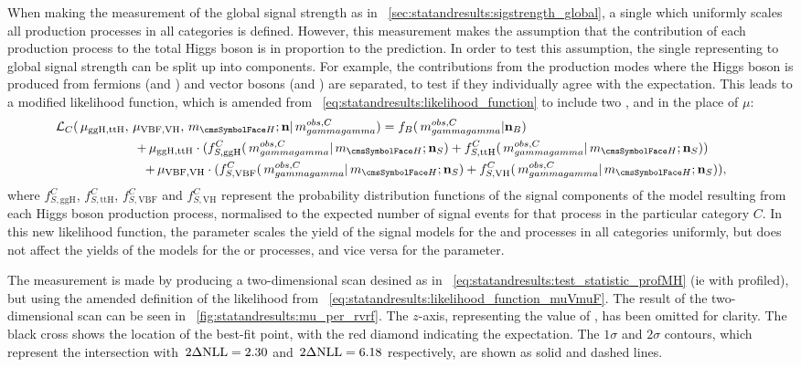 When making the measurement of the global signal strength as in \Sec~\ref{sec:statandresults:sigstrength_global}, a single \POI which uniformly scales all production processes in all categories is defined. However, this measurement makes the assumption that the contribution of each production process to the total Higgs boson \crosssection is in proportion to the \SM prediction. In order to test this assumption, the single \POI representing to global signal strength can be split up into components. For example, the contributions from the production modes where the Higgs boson is produced from fermions (\ggH and \ttH) and vector bosons (\VBF and \VH) are separated, to test if they individually agree with the \SM expectation. This leads to a modified likelihood function, which is amended from \Eq~\ref{eq:statandresults:likelihood_function} to include two \POI\s, \muF and \muV in the place of $\mu$:
\begin{equation}
\label{eq:statandresults:likelihood_function_muVmuF}
\begin{split} \mathcal{L}_C(\muF, \muV, \mH; \mathbf{n} | \mgg^{obs,C} ) = f_B(\mgg^{obs,C} | \mathbf{n}_B )\hspace{6cm}  \\ 
+\muF \cdot ( f^C_{S,{\text{ggH}}}(\mgg^{obs,C} |\mH ; \mathbf{n}_S) +  f^C_{S,{\text{ttH}}}(\mgg^{obs,C} |\mH ; \mathbf{n}_S) ) \hspace{1cm} \\  
+\muV \cdot ( f^C_{S,{\text{VBF}}}(\mgg^{obs,C} |\mH ; \mathbf{n}_S) +  f^C_{S,{\text{VH}}}(\mgg^{obs,C} |\mH ; \mathbf{n}_S) ), \hspace{0.5cm} \\  
\end{split} 
\end{equation}
where $f^C_{S,{\text{ggH}}}$, $f^C_{S,{\text{ttH}}}$, $f^C_{S,{\text{VBF}}}$ and $f^C_{S,{\text{VH}}}$ represent the probability distribution functions of the signal components of the model resulting from each Higgs boson production process, normalised to the expected number of signal events for that process in the particular category $C$. In this new likelihood function, the \muF parameter scales the yield of the signal models for the \ggH and \ttH processes in all categories uniformly, but does not affect the yields of the models for the \VBF or \VH processes, and vice versa for the \muV parameter.

The measurement is made by producing a two-dimensional \DNLL scan desined as in \Eq~\ref{eq:statandresults:test_statistic_profMH} (ie with \mH profiled), but using the amended definition of the likelihood from \Eq~\ref{eq:statandresults:likelihood_function_muVmuF}. 
The result of the two-dimensional scan can be seen in \Fig~\ref{fig:statandresults:mu_per_rvrf}. The $z$-axis, representing the value of \DNLL, has been omitted for clarity. The black cross shows the location of the best-fit point, with the red diamond indicating the \SM expectation. The $1\sigma$ and $2\sigma$ contours, which represent the intersection with $\,2\Delta\text{NLL}=2.30$ and $\,2\Delta\text{NLL}=6.18$ respectively, are shown as solid and dashed lines. 

